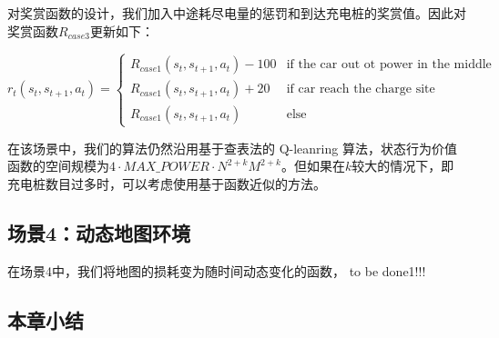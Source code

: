 \documentclass{standalone}
\begin{document}
对奖赏函数的设计，我们加入中途耗尽电量的惩罚和到达充电桩的奖赏值。因此对奖赏函数$R_{case3}$更新如下：
\begin{center}
    \begin{equation}
    r_t(s_t, s_{t+1}, a_t) = \begin{cases}
     R_{case1}(s_t, s_{t+1}, a_t) - 100 &\mbox{if the car out ot power in the middle}\\
     R_{case1}(s_t, s_{t+1}, a_t) + 20&\mbox{if car reach the charge site}\\
     R_{case1}(s_t, s_{t+1}, a_t)&\mbox{else}
     \end{cases}
    \end{equation}
\end{center}
在该场景中，我们的算法仍然沿用基于查表法的 Q-leanring 算法，状态行为价值函数的空间规模为$4\cdot MAX\_POWER\cdot N^{2+k}M^{2+k}$。但如果在$k$较大的情况下，即充电桩数目过多时，可以考虑使用基于函数近似的方法。
\subsection{场景4：动态地图环境}
在场景4中，我们将地图的损耗变为随时间动态变化的函数，
to be done1!!!
\subsection{本章小结}
\end{document}
